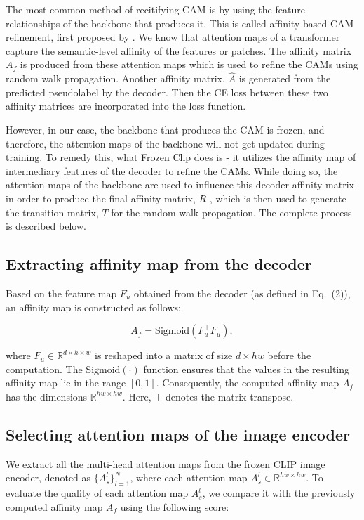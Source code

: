 The most common method of recitifying CAM is by using the feature relationships of the backbone that produces it. This is called affinity-based CAM refinement, first proposed by \cite{wsss_affinitynet}. We know that attention maps of a transformer capture the semantic-level affinity of the features or patches. The affinity matrix $A_f$ is produced from these attention maps which is used to refine the CAMs using random walk propagation. Another affinity matrix, $\hat{A}$ is generated from the predicted pseudolabel by the decoder. Then the CE loss between these two affinity matrices are incorporated into the loss function.

However, in our case, the backbone that produces the CAM is frozen, and therefore, the attention maps of the backbone will not get updated during training. To remedy this, what Frozen Clip \cite{wsss_frozen_clip} does is - it utilizes the affinity map of intermediary features of the decoder to refine the CAMs. While doing so, the attention maps of the backbone are used to influence this decoder affinity matrix in order to produce the final affinity matrix, $R$ , which is then used to generate the transition matrix, $T$ for the random walk propagation. The complete process is described below.

\subsection{Extracting affinity map from the decoder}
\label{subsec:decoder_aff_mat}
Based on the feature map $F_u$ obtained from the decoder (as defined in Eq.~(2)), an affinity map is constructed as follows:

\begin{equation}
    \label{eq: A_f}
    A_f = \text{Sigmoid}(F_u^\top F_u),
\end{equation}

where $F_u \in \mathbb{R}^{d \times h \times w}$ is reshaped into a matrix of size $d \times hw$ before the computation. The $\text{Sigmoid}(\cdot)$ function ensures that the values in the resulting affinity map lie in the range $[0, 1]$. Consequently, the computed affinity map $A_f$ has the dimensions $\mathbb{R}^{hw \times hw}$. Here, $\top$ denotes the matrix transpose.

\subsection{Selecting attention maps of the image encoder}
\label{subsec:att_map_encoder}
We extract all the multi-head attention maps from the frozen CLIP image encoder, denoted as $\{A_s^l\}_{l=1}^N$, where each attention map $A_s^l \in \mathbb{R}^{hw \times hw}$. To evaluate the quality of each attention map $A_s^l$, we compare it with the previously computed affinity map $A_f$ using the following score:

